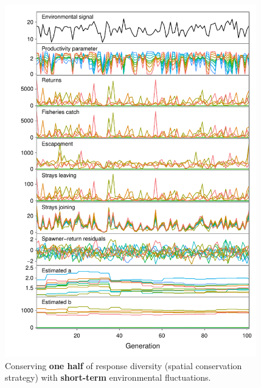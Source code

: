 \begin{figure}[htbp]
\centering
\includegraphics[width=4.3in]{metafolio/spatial-arma-sim-onehalf}
\caption{Conserving \textbf{one half} of response diversity (spatial
conservation strategy) with \textbf{short-term} environmental fluctuations.}
\label{f:eg-sp-arma-half}
\end{figure}

\clearpage

